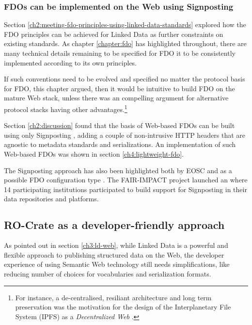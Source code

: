 \subsubsection{FDOs can be implemented on the Web using Signposting}
\label{ch61:signposting}

Section \vref{ch2:meeting-fdo-principles-using-linked-data-standards} explored how the FDO principles can be achieved for Linked Data as further constraints on existing standards.
As chapter \ref{chapter:fdo} has highlighted throughout, there are many technical details remaining to be specified for FDO it to be consistently implemented according to its own principles.

If such conventions need to be evolved and specified no matter the protocol basis for FDO, this chapter argued, then it would be intuitive to build FDO on the mature Web stack, unless there was an compelling argument for alternative protocol stacks having other advantages.\footnote{
  For instance, a de-centralised, resiliant architecture and long term preservation was the motivation for the design of the Interplanetary File System (IPFS) as a \emph{Decentralized Web} \cite{Trautwein 2022}.
}

Section \ref{ch2:discussion} found that the basis of Web-based FDOs can be built using only Signposting \cite{vandesompel2015,Van de Sompel 2022}, adding a couple of non-intrusive HTTP headers that are agnostic to metadata standards and serializations. An implementation of such Web-based FDOs was shown in section \ref{ch4:lightweight-fdo}. 

The Signposting approach has also been highlighted both by EOSC \cite{10.5281/zenodo.7463421,Wilkinson2024} and as a possible FDO configuration type \cite{fdo-ConfigurationTypes}.
The FAIR-IMPACT project launched an  where 14 participating institutions participated to build support for Signposting \cite{soilandreyes2023b} in their data repositories and platforms.



\subsection{RO-Crate as a developer-friendly approach}
\label{ch61:crate}

As pointed out in section \vref{ch3:ld-web}, while Linked Data is a powerful and flexible approach to publishing structured data on the Web, the developer experience of using Semantic Web technology still needs simplifications, like reducing number of choices for vocabularies and serialization formats. 

